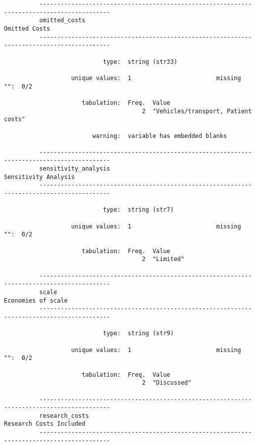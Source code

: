 \documentclass{article}
\begin{document}
\begin{verbatim}
          ------------------------------------------------------------------------------------------
          omitted_costs                                                                Omitted Costs
          ------------------------------------------------------------------------------------------
          
                            type:  string (str33)
          
                   unique values:  1                        missing "":  0/2
          
                      tabulation:  Freq.  Value
                                       2  "Vehicles/transport, Patient costs"
          
                         warning:  variable has embedded blanks
          
          ------------------------------------------------------------------------------------------
          sensitivity_analysis                                                  Sensitivity Analysis
          ------------------------------------------------------------------------------------------
          
                            type:  string (str7)
          
                   unique values:  1                        missing "":  0/2
          
                      tabulation:  Freq.  Value
                                       2  "Limited"
          
          ------------------------------------------------------------------------------------------
          scale                                                                   Economies of scale
          ------------------------------------------------------------------------------------------
          
                            type:  string (str9)
          
                   unique values:  1                        missing "":  0/2
          
                      tabulation:  Freq.  Value
                                       2  "Discussed"
          
          ------------------------------------------------------------------------------------------
          research_costs                                                     Research Costs Included
          ------------------------------------------------------------------------------------------
          

\end{verbatim}
\end{document}

